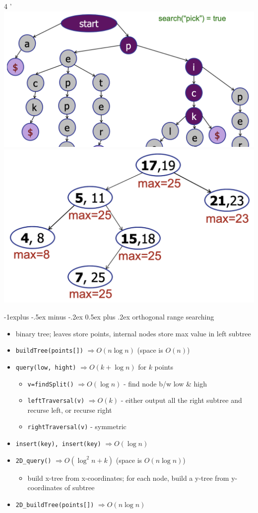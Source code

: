 \documentclass[10pt, landscape]{article}
\makeatletter
\renewcommand{\subsection}{\@startsection{subsection}{2}{0mm}%
                                {-1explus -.5ex minus -.2ex}%
                                {0.5ex plus .2ex}%
                                {\normalfont\normalsize\bfseries}}
\let\Then\Rightarrow
\newcommand{\code}[1]{\textcolor{myblue}{\texttt{#1}}}
\makeatother
\begin{document}
\begin{multicols}{4
    '}
\includegraphics[width=0.5\linewidth]{cs2040s-trie.png}
\includegraphics[width=0.45\linewidth]{cs2040s-interval-tree.png}

\subsection{orthogonal range searching}
\begin{itemize}
    \item binary tree; leaves store points, internal nodes store max value in left subtree
    \item \code{buildTree(points[])} $\Then O(n \log n)$ \quad (space is $O(n)$)
    \item \code{query(low, hight)} $\Then O(k + \log n)$ for $k$ points
    \begin{itemize}
        \item \code{v=findSplit()} $\Then O(\log n)$ - find node b/w low \& high
        \item \code{leftTraversal(v)} $\Then O(k)$ - either output all the right subtree and recurse left, or recurse right 
        \item \code{rightTraversal(v)} - symmetric
    \end{itemize}
    \item \code{insert(key), insert(key)} $\Then O(\log n)$ 
    \item \code{2D\_query()} $\Then O(\log^2n + k)$ \quad (space is $O(n \log n)$)
    \begin{itemize}
        \item build x-tree from x-coordinates; for each node, build a y-tree from y-coordinates of subtree
    \end{itemize}
    \item \code{2D\_buildTree(points[])} $\Then O(n \log n)$
\end{itemize}


\end{multicols}
\end{document}
